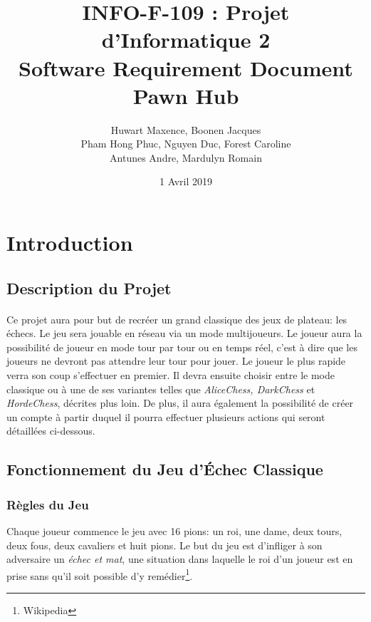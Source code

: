 \documentclass[10pt, a4paper]{article}
\title{\LARGE{INFO-F-109 : Projet d'Informatique 2 }\\
       \textbf{Software Requirement Document\\
	   Pawn Hub}}
\author{Huwart Maxence, Boonen Jacques\\
		Pham Hong Phuc, Nguyen Duc, Forest Caroline\\
		Antunes Andre, Mardulyn Romain}
\date{1 Avril 2019}
\begin{document}
	\maketitle
	\newpage
	\renewcommand{\contentsname}{Table des Matières}
	\tableofcontents %
	\newpage
	\section{Introduction}
		\subsection{Description du Projet}
			\paragraph{}Ce projet aura pour but de recréer un grand classique des jeux de plateau: les échecs. Le jeu sera jouable en réseau via un mode multijoueurs. Le joueur aura la possibilité de joueur en mode tour par tour ou en temps réel, c'est à dire que les joueurs ne devront pas attendre leur tour pour jouer. Le joueur le plus rapide verra son coup s'effectuer en premier. Il devra ensuite choisir entre le mode classique ou à une de ses variantes telles que  {\itshape AliceChess, DarkChess} et {\itshape HordeChess}, décrites plus loin. De plus, il aura également la possibilité de créer un compte à partir duquel il pourra effectuer plusieurs actions qui seront détaillées ci-dessous.

			\subsection{Fonctionnement du Jeu d'Échec Classique}
			\subsubsection{Règles du Jeu}
			Chaque joueur commence le jeu avec 16 pions: un roi, une dame, deux tours, deux fous, deux cavaliers et huit pions. Le but du jeu est d'infliger à son adversaire un \textit{échec et mat}, une situation dans laquelle le roi d'un joueur est en prise sans qu'il soit possible d'y remédier\footnote{Wikipedia}.
\end{document}
